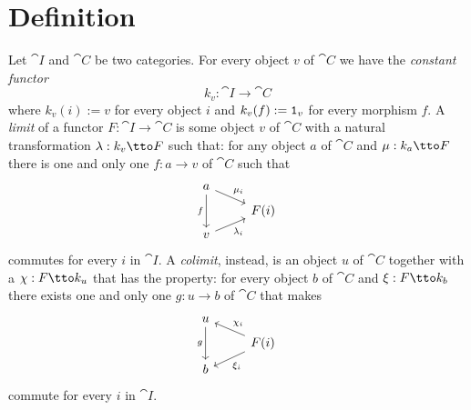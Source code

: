 
\section{Definition}


\begin{definition}\label{definition:LimitsAndColimits}
  Let \(\cat I\) and \(\cat C\) be two categories. For every object
  \(v\) of \(\cat C\) we have the {\em constant functor}
  \[k_v : \cat I \to \cat C\] where \(k_v(i) := v\) for every object
  \(i\) and \(k_v(f) := \mathtt 1_v\) for every morphism
  \(f\).  A {\em limit} of a functor
  \(F : \cat I \to \cat C\) is some object \(v\) of \(\cat C\) with a
  natural transformation \(\lambda : k_v \tto F\) such that:
  for any object \(a\) of \(\cat C\) and \(\mu : k_a \tto F\) there is
  one and only one \(f : a \to v\) of \(\cat C\) such that
  \[\begin{tikzcd}[row sep=tiny]
      a \ar["{\mu_i}", dr] \ar["f", dd, swap] \\
      & F(i) \\
      v \ar["{\lambda_i}", ur, swap]
    \end{tikzcd}\] commutes for every \(i\) in \(\cat I\).
  A {\em colimit}, instead, is an object \(u\) of \(\cat C\) together
  with a \(\chi : F \tto k_u\) that has the property:
  for every object \(b\) of \(\cat C\) and \(\xi : F \tto k_b\) there
  exists one and only one \(g : u \to b\) of \(\cat C\) that makes
  \[\begin{tikzcd}[row sep=tiny]
      u  \ar["g", dd, swap] \\
      & F(i) \ar["{\chi_i}", ul, swap] \ar["{\xi_i}", dl]\\
      b
    \end{tikzcd}\] commute for every \(i\) in \(\cat I\).
\end{definition}


